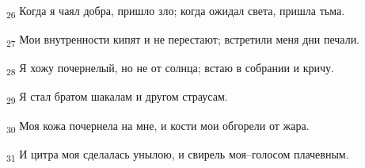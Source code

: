 \begin{tcolorbox}
\textsubscript{26} Когда я чаял добра, пришло зло; когда ожидал света, пришла тьма.
\end{tcolorbox}
\begin{tcolorbox}
\textsubscript{27} Мои внутренности кипят и не перестают; встретили меня дни печали.
\end{tcolorbox}
\begin{tcolorbox}
\textsubscript{28} Я хожу почернелый, но не от солнца; встаю в собрании и кричу.
\end{tcolorbox}
\begin{tcolorbox}
\textsubscript{29} Я стал братом шакалам и другом страусам.
\end{tcolorbox}
\begin{tcolorbox}
\textsubscript{30} Моя кожа почернела на мне, и кости мои обгорели от жара.
\end{tcolorbox}
\begin{tcolorbox}
\textsubscript{31} И цитра моя сделалась унылою, и свирель моя--голосом плачевным.
\end{tcolorbox}
